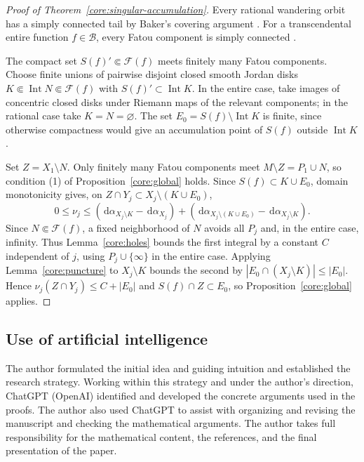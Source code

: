 \documentclass[11pt,reqno]{amsart}
\newcommand{\Fat}{\mathcal F}
\newcommand{\dd}{\,\mathrm d}
\theoremstyle{definition}
\numberwithin{equation}{section}
\begin{document}
\begin{proof}[Proof of Theorem~\ref{core:singular-accumulation}]
Every rational wandering orbit has a simply connected tail by Baker's
covering argument \cite[Lemma~5.34, p.~90]{McMullen}.
For a transcendental entire function $f\in\mathcal B$, every Fatou
component is simply connected \cite[Proposition~3, p.~993]{EL}.

The compact set $S(f)'\Subset\Fat(f)$ meets finitely many Fatou
components. Choose finite unions of pairwise disjoint closed smooth
Jordan disks $K\Subset\operatorname{Int}N\Subset\Fat(f)$ with
$S(f)'\subset\operatorname{Int}K$. In the entire case, take images of
concentric closed disks under Riemann maps of the relevant components;
in the rational case take $K=N=\varnothing$. The set
$E_0=S(f)\setminus\operatorname{Int}K$ is finite, since otherwise
compactness would give an accumulation point of $S(f)$ outside
$\operatorname{Int}K$.

Set $Z=X_1\setminus N$. Only finitely many Fatou components meet
$M\setminus Z=P_1\cup N$, so condition (1) of
Proposition~\ref{core:global} holds. Since $S(f)\subset K\cup E_0$,
domain monotonicity gives, on
$Z\cap Y_j\subset X_j\setminus(K\cup E_0)$,
\[
 0\le\nu_j
 \le (\dd\alpha_{X_j\setminus K}-\dd\alpha_{X_j})
    +(\dd\alpha_{X_j\setminus(K\cup E_0)}
                              -\dd\alpha_{X_j\setminus K}).
\]
Since $N\Subset\Fat(f)$, a fixed neighborhood of $N$ avoids all $P_j$
and, in the entire case, infinity. Thus Lemma~\ref{core:holes} bounds
the first integral by a constant $C$ independent of $j$, using
$P_j\cup\{\infty\}$ in the entire case. Applying
Lemma~\ref{core:puncture} to $X_j\setminus K$ bounds the second by
$|E_0\cap(X_j\setminus K)|\le|E_0|$.
Hence $\nu_j(Z\cap Y_j)\le C+|E_0|$ and $S(f)\cap Z\subset E_0$,
so Proposition~\ref{core:global} applies.
\end{proof}

\subsection*{Use of artificial intelligence}
The author formulated the initial idea and guiding intuition and
established the research strategy. Working within this strategy and
under the author's direction, ChatGPT (OpenAI) identified and developed
the concrete arguments used in the proofs. The author also used ChatGPT
to assist with organizing and revising the manuscript and checking the
mathematical arguments. The author takes full responsibility for the
mathematical content, the references, and the final presentation of the
paper.
\end{document}
